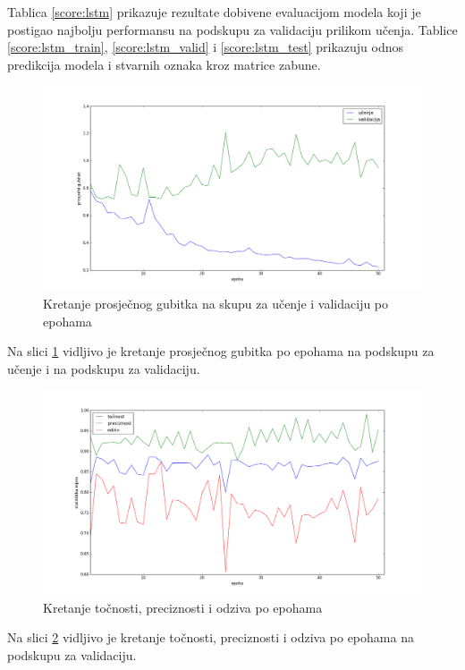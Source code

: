 \documentclass[times, utf8, diplomski, numeric]{fer}
\begin{document}
\noindent Tablica \ref{score:lstm} prikazuje rezultate dobivene evaluacijom modela koji je postigao najbolju performansu na podskupu za validaciju prilikom učenja.
Tablice \ref{score:lstm_train}, \ref{score:lstm_valid} i \ref{score:lstm_test} prikazuju odnos predikcija modela i stvarnih oznaka kroz matrice zabune.

\begin{figure}[H]
\centering
\includegraphics[scale=0.35]{images/lstm_loss.png}
\caption{Kretanje prosječnog gubitka na skupu za učenje i validaciju po epohama}
\label{img:lstm_loss}
\end{figure}
\noindent Na slici \ref{img:lstm_loss} vidljivo je kretanje prosječnog gubitka po epohama na podskupu za učenje i na podskupu za validaciju.

\begin{figure}[H]
\centering
\includegraphics[scale=0.35]{images/lstm_ac_ap.png}
\caption{Kretanje točnosti, preciznosti i odziva po epohama}
\label{img:lstm_ac_ap}
\end{figure}
\noindent Na slici \ref{img:lstm_ac_ap} vidljivo je kretanje točnosti, preciznosti i odziva po epohama na podskupu za validaciju.
\end{document}
